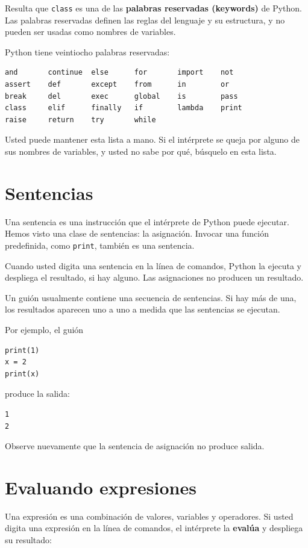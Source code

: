 Resulta que \texttt{class} es una de las \textbf{palabras reservadas
(keywords)} de Python. Las palabras reservadas definen las reglas
del lenguaje y su estructura, y no pueden ser usadas como nombres
de variables.


Python tiene veintiocho palabras reservadas:

\begin{verbatim}
and       continue  else      for       import    not       
assert    def       except    from      in        or        
break     del       exec      global    is        pass      
class     elif      finally   if        lambda    print     
raise     return    try       while
\end{verbatim}


Usted puede mantener esta lista a mano. Si el intérprete se queja
por alguno de sus nombres de variables, y usted no sabe por qué, búsquelo
en esta lista.

\section{Sentencias}

Una sentencia es una instrucción que el intérprete de Python puede
ejecutar. Hemos visto una clase de sentencias: la asignación. Invocar
una función predefinida, como \texttt{print}, también es una sentencia.

Cuando usted digita una sentencia en la línea de comandos, Python
la ejecuta y despliega el resultado, si hay alguno. Las asignaciones
no producen un resultado.

Un guión usualmente contiene una secuencia de sentencias. Si hay más
de una, los resultados aparecen uno a uno a medida que las sentencias
se ejecutan.

Por ejemplo, el guión

\begin{verbatim}
print(1)
x = 2
print(x)
\end{verbatim}
produce la salida:
\begin{verbatim}
1
2
\end{verbatim}
Observe nuevamente que la sentencia de asignación no produce salida.

\section{Evaluando expresiones}

Una expresión es una combinación de valores, variables y operadores.
Si usted digita una expresión en la línea de comandos, el intérprete
la \textbf{evalúa} y despliega su resultado:

